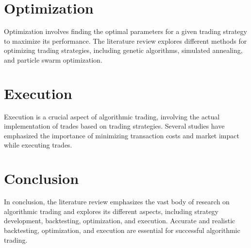 \section{Optimization}
Optimization involves finding the optimal parameters for a given trading strategy to maximize its performance. The literature review explores different methods for optimizing trading strategies, including genetic algorithms, simulated annealing, and particle swarm optimization.

\section{Execution}
Execution is a crucial aspect of algorithmic trading, involving the actual implementation of trades based on trading strategies. Several studies have emphasized the importance of minimizing transaction costs and market impact while executing trades.

\section{Conclusion}
In conclusion, the literature review emphasizes the vast body of research on algorithmic trading and explores its different aspects, including strategy development, backtesting, optimization, and execution. Accurate and realistic backtesting, optimization, and execution are essential for successful algorithmic trading.